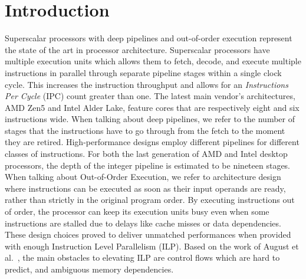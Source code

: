 \section{Introduction}
Superscalar processors with deep pipelines and out-of-order execution represent the state of the art in processor architecture. Superscalar processors have multiple execution units which allows them to fetch, decode, and execute multiple instructions in parallel through separate pipeline stages within a single clock cycle. This increases the instruction throughput and allows for an \textit{Instructions Per Cycle} (IPC) count greater than one. The latest main vendor's architectures, AMD Zen5 and Intel Alder Lake, feature cores that are respectively eight and six instructions wide. When talking about deep pipelines, we refer to the number of stages that the instructions have to go through from the fetch to the moment they are retired. High-performance designs employ different pipelines for different classes of instructions. For both the last generation of AMD and Intel desktop processors, the depth of the integer pipeline is estimated to be nineteen stages. When talking about Out-of-Order Execution, we refer to architecture design where instructions can be executed as soon as their input operands are ready, rather than strictly in the original program order. By executing instructions out of order, the processor can keep its execution units busy even when some instructions are stalled due to delays like cache misses or data dependencies. These design choices proved to deliver unmatched performances when provided with enough Instruction Level Parallelism (ILP). Based on the work of August et al.~\cite{August98}, the main obstacles to elevating ILP are control flows which are hard to predict, and ambiguous memory dependencies. 

